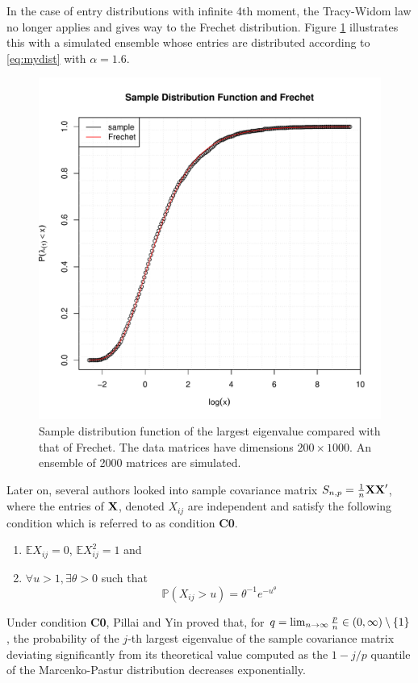 \documentclass[11pt,reqno]{amsart}
\newcommand{\E}{\mathbb{E}}
\renewcommand{\P}{\mathbb{P}}
\newcommand{\1}{\mathds{1}}
\newcommand{\0}{\boldsymbol{0}}
\newcommand{\4}{\mathchoice{\mskip1.5mu}{\mskip1.5mu}{}{}}
\newcommand{\5}{\mathchoice{\mskip-1.5mu}{\mskip-1.5mu}{}{}}
\newcommand{\2}{\penalty250\mskip\thickmuskip\mskip-\thinmuskip} %
\begin{document}
\newpage
In the case of entry distributions with infinite 4th moment, the
Tracy-Widom law no longer applies and gives way to the Frechet
distribution. Figure \ref{fig:MyDist-Frechet} illustrates this with a
simulated ensemble whose entries are distributed according to
\eqref{eq:mydist} with $\alpha = 1.6$.
\begin{figure}[htb!]
  \centering
  \includegraphics[scale=0.5]{MyDist-Frechet.pdf}  
  \caption{Sample distribution function of the largest eigenvalue
    compared with that of Frechet. The data matrices have dimensions
    $200 \times 1000$. An ensemble of 2000 matrices are simulated.}
  \label{fig:MyDist-Frechet}
\end{figure}

\newpage
Later on, several authors \cite{Pillai:Yin:2011, tao:vu:2012,
  Wang:2012} looked into sample covariance matrix $S_{n, p} = {1
  \over n} \bf{XX}'$, where the entries of $\bf X$, denoted $X_{ij}$
are independent and satisfy the following condition which is referred
to as condition {\bf C0}.
\begin{enumerate}
\item $\E X_{ij} = 0$, $\E X_{ij}^2 = 1$ and
\item $\forall u > 1, \exists \theta > 0$ such that
  \[
  \P(X_{ij} > u) = \theta^{-1} e^{-u^{\theta}}
  \]
\end{enumerate}
Under condition {\bf C0}, Pillai and Yin \cite{Pillai:Yin:2011} proved
that, for $q = \lim_{n \to \infty} {p \over n} \in (0, \infty)
\setminus \{1\}$, the probability of the $j$-th largest eigenvalue of
the sample covariance matrix deviating significantly from its
theoretical value computed as the $1 - j/p$ quantile of the
Marcenko-Pastur distribution decreases exponentially\footnotemark.
\end{document}
